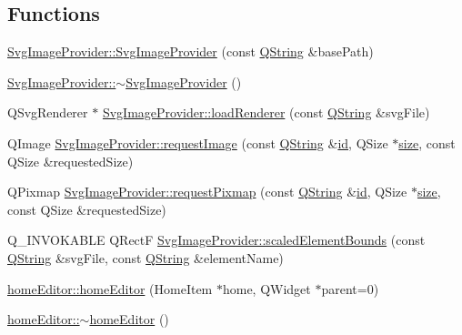 \subsection*{Functions}
\begin{DoxyCompactItemize}
\item 
\hyperlink{group___o_p_map_plugin_ga2b9c3d2098c51db2899a9d98684abb21}{Svg\-Image\-Provider\-::\-Svg\-Image\-Provider} (const \hyperlink{group___u_a_v_objects_plugin_gab9d252f49c333c94a72f97ce3105a32d}{Q\-String} \&base\-Path)
\item 
\hyperlink{group___o_p_map_plugin_gadd8520789d1a874b7a4074bfafac4ea3}{Svg\-Image\-Provider\-::$\sim$\-Svg\-Image\-Provider} ()
\item 
Q\-Svg\-Renderer $\ast$ \hyperlink{group___o_p_map_plugin_ga86ec36e3e8140373701546a7bbb0460b}{Svg\-Image\-Provider\-::load\-Renderer} (const \hyperlink{group___u_a_v_objects_plugin_gab9d252f49c333c94a72f97ce3105a32d}{Q\-String} \&svg\-File)
\item 
Q\-Image \hyperlink{group___o_p_map_plugin_ga47800a9f6d3722318713988d27fde449}{Svg\-Image\-Provider\-::request\-Image} (const \hyperlink{group___u_a_v_objects_plugin_gab9d252f49c333c94a72f97ce3105a32d}{Q\-String} \&\hyperlink{glext_8h_a58c2a664503e14ffb8f21012aabff3e9}{id}, Q\-Size $\ast$\hyperlink{glext_8h_a014d89bd76f74ef3a29c8f04b473eb76}{size}, const Q\-Size \&requested\-Size)
\item 
Q\-Pixmap \hyperlink{group___o_p_map_plugin_ga8d12637852381c8b3d6682d4bed9e4c7}{Svg\-Image\-Provider\-::request\-Pixmap} (const \hyperlink{group___u_a_v_objects_plugin_gab9d252f49c333c94a72f97ce3105a32d}{Q\-String} \&\hyperlink{glext_8h_a58c2a664503e14ffb8f21012aabff3e9}{id}, Q\-Size $\ast$\hyperlink{glext_8h_a014d89bd76f74ef3a29c8f04b473eb76}{size}, const Q\-Size \&requested\-Size)
\item 
Q\-\_\-\-I\-N\-V\-O\-K\-A\-B\-L\-E Q\-Rect\-F \hyperlink{group___o_p_map_plugin_gaaa6ab880f473fb953480012d1c5b8a73}{Svg\-Image\-Provider\-::scaled\-Element\-Bounds} (const \hyperlink{group___u_a_v_objects_plugin_gab9d252f49c333c94a72f97ce3105a32d}{Q\-String} \&svg\-File, const \hyperlink{group___u_a_v_objects_plugin_gab9d252f49c333c94a72f97ce3105a32d}{Q\-String} \&element\-Name)
\item 
\hyperlink{group___o_p_map_plugin_ga0036d5e97a686e97c193d02489b4d5fb}{home\-Editor\-::home\-Editor} (Home\-Item $\ast$home, Q\-Widget $\ast$parent=0)
\item 
\hyperlink{group___o_p_map_plugin_ga774f5e26cbfa6c2c2fe3fb6a9317abcf}{home\-Editor\-::$\sim$home\-Editor} ()

\end{DoxyCompactItemize}
